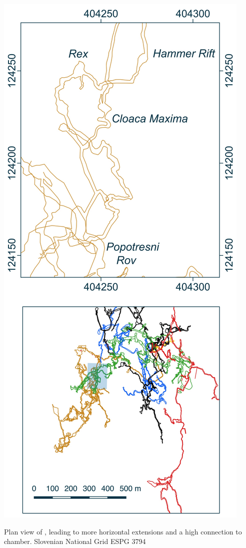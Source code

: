 \begin{marginsurvey}
\checkoddpage \ifoddpage \forcerectofloat \else \forceversofloat \fi
\centering
 \includegraphics[width=\linewidth]{images/little_insets/cm_inset.pdf}
 \caption[Cloaca Maxima]{Plan view of \protect{}, leading to more horizontal extensions and a high connection to \protect{} chamber. Slovenian National Grid ESPG 3794}
 \label{Mountain King inset}
\end{marginsurvey}

